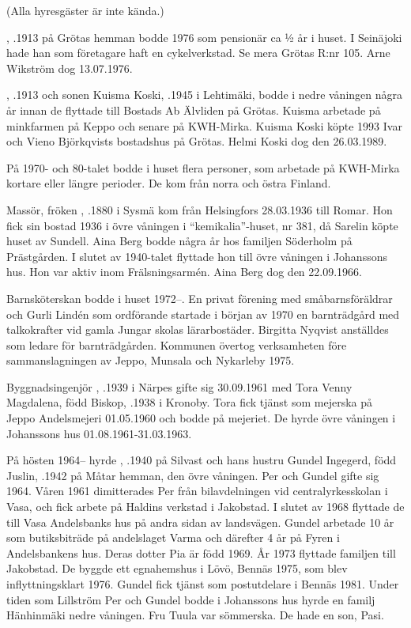   (Alla hyresgäster är inte kända.)

, .1913 på Grötas hemman bodde 1976 som pensionär ca ½ år i huset. I Seinäjoki hade han som företagare haft en cykelverkstad. Se mera Grötas R:nr 105. Arne Wikström dog 13.07.1976.

, .1913 och sonen Kuisma Koski, .1945 i Lehtimäki,	bodde i nedre våningen några år innan de flyttade till Bostads Ab Älvliden på Grötas. Kuisma arbetade på minkfarmen på Keppo och senare på KWH-Mirka. Kuisma Koski köpte 	1993 Ivar och Vieno Björkqvists bostadshus på Grötas. Helmi Koski dog den 26.03.1989.

På 1970- och 80-talet bodde i huset flera personer, som arbetade på KWH-Mirka kortare eller längre perioder. De kom från norra och östra	Finland.

Massör, fröken , .1880 i Sysmä kom från Helsingfors 28.03.1936 till Romar. Hon fick sin bostad 1936 i övre våningen i ``kemikalia''-huset, nr 381, då Sarelin köpte huset av Sundell. Aina Berg bodde några år hos familjen Söderholm på Prästgården. I slutet av 1940-talet flyttade hon till övre våningen i Johanssons hus. Hon var aktiv inom Frälsningsarmén. Aina Berg dog den 22.09.1966.

Barnsköterskan  bodde i huset 1972--. En privat förening med småbarnsföräldrar och Gurli Lindén som ordförande startade i början av 1970 en barnträdgård med talkokrafter vid gamla Jungar skolas lärarbostäder. Birgitta Nyqvist anställdes som ledare för barnträdgården. Kommunen övertog verksamheten före sammanslagningen av Jeppo, Munsala och Nykarleby 1975.

Byggnadsingenjör , .1939 i Närpes gifte sig 30.09.1961 med Tora Venny Magdalena, född Biskop, .1938 i Kronoby. Tora fick tjänst som mejerska på Jeppo Andelsmejeri 01.05.1960 och bodde på mejeriet. De hyrde övre våningen i Johanssons hus 01.08.1961-31.03.1963.

På hösten 1964-- hyrde , .1940 på Silvast och hans hustru Gundel Ingegerd, född Juslin, .1942 på Måtar hemman, den övre våningen. Per och Gundel gifte sig 1964. Våren 1961 dimitterades Per från bilavdelningen vid centralyrkesskolan i Vasa, och fick arbete på Haldins verkstad i Jakobstad. I slutet av 1968 flyttade de till Vasa Andelsbanks hus på andra sidan av landsvägen. Gundel arbetade 10 år som butiksbiträde på andelslaget Varma och därefter 4 år på Fyren i Andelsbankens hus. Deras dotter Pia är född 1969.  År 1973 flyttade familjen till Jakobstad. De byggde ett egnahemshus i Lövö, Bennäs 1975, som blev inflyttningsklart 1976. Gundel fick tjänst som postutdelare i Bennäs 1981. Under tiden som Lillström Per och Gundel bodde i Johanssons hus hyrde en familj Hänhinmäki nedre våningen. Fru Tuula var sömmerska. De hade en son, Pasi.

